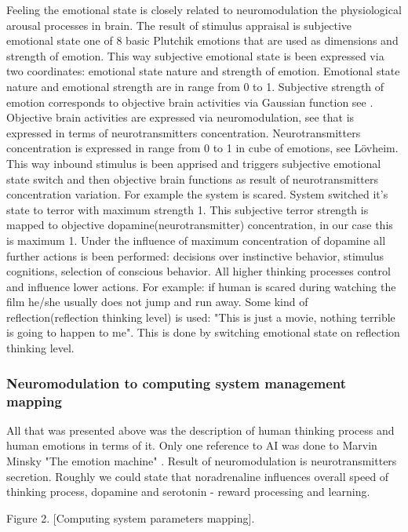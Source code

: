 Feeling the emotional state is closely related to neuromodulation the physiological arousal processes in brain. The result of stimulus appraisal is subjective emotional state one of 8 basic Plutchik emotions that are used as dimensions and strength of emotion. This way subjective emotional state is been expressed via two coordinates: emotional state nature and strength of emotion. Emotional state nature and emotional strength are in range from 0 to 1. Subjective strength of emotion corresponds to objective brain activities via Gaussian function see \cite{hourglass}. Objective brain activities are expressed via neuromodulation, see \cite{emotionsbraintorobot} that is expressed in terms of neurotransmitters concentration. Neurotransmitters  concentration is expressed in range from 0 to 1 in cube of emotions, see L\"{o}vheim\cite{cubeofemotions}. This way inbound stimulus is been apprised and triggers subjective emotional state switch and then objective brain functions as result of neurotransmitters concentration variation. For example the system is scared. System switched it's state to terror with maximum strength 1. This subjective terror strength is mapped to objective dopamine(neurotransmitter) concentration, in our case this is maximum 1. Under the influence of maximum concentration of dopamine all further actions is been performed: decisions over instinctive behavior, stimulus cognitions, selection of conscious behavior. All higher thinking processes control and influence lower actions. For example: if human is scared during watching the film he/she usually does not jump and run away. Some kind of reflection(reflection thinking level) is used: "This is just a movie, nothing terrible is going to happen to me". This is done by switching emotional state on reflection thinking level.

\subsubsection{Neuromodulation to computing system management mapping}

All that was presented above was the description of human thinking process and human emotions in terms of it. Only one reference to AI was done to Marvin Minsky "The emotion machine" \cite{emotionmachine}. Result of neuromodulation is neurotransmitters secretion. Roughly we could state that noradrenaline influences overall speed of thinking process, dopamine and serotonin - reward processing and learning.

Figure 2. [Computing system parameters mapping].

